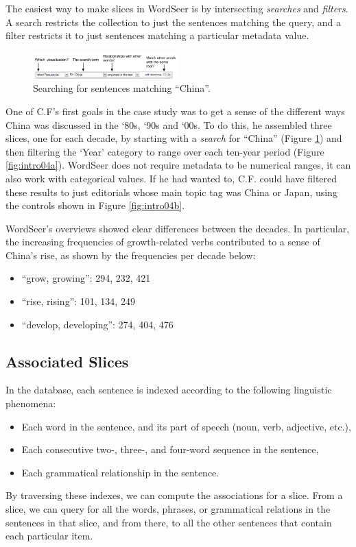 \documentclass{sig-alternate}
\begin{document}
The easiest way to make slices in WordSeer is by intersecting \emph{searches} and \emph{filters}.  A search restricts the collection to just the sentences matching the query, and a filter restricts it to just sentences matching a particular metadata value. 
\begin{figure}[ht!]
\begin{center}
	\includegraphics[width=0.5\textwidth]{fig/intro/03b.png}
\end{center}
    \caption{%
        Searching for sentences matching ``China''.\label{fig:intro03}
     }%
\end{figure}
One of C.F's first goals in the case study was to get a sense of the different ways China was discussed in the `80s, `90s and `00s. To do this, he assembled three slices, one for each decade, by starting with a \emph{search} for ``China'' (Figure \ref{fig:intro03})  and then filtering the `Year' category to range over each ten-year period (Figure \ref{fig:intro04a}).  WordSeer does not require metadata to be numerical ranges, it can also work with categorical values. If he had wanted to, C.F. could have filtered these results to just editorials whose main topic tag was China or Japan, using the controls shown in Figure \ref{fig:intro04b}. 

WordSeer's overviews showed clear differences between the decades. In particular, the increasing  frequencies of growth-related verbs contributed to a sense of China's rise, as shown by the frequencies per decade below:
\begin{itemize}
\item ``grow, growing'':  294, 232, 421
\item ``rise, rising'': 101, 134, 249
\item ``develop, developing'': 274, 404, 476
\end{itemize}

\subsection{Associated Slices}

 In the database, each sentence is indexed according to the following linguistic phenomena:
\begin{itemize}
  \item Each word in the sentence, and its part of speech (noun, verb, adjective, etc.),
  \item Each consecutive two-, three-, and four-word sequence in the sentence,
  \item Each grammatical relationship in the sentence. 
  \end{itemize}  
 By traversing these indexes, we can compute the associations for a slice. From a slice, we can query for all the words, phrases, or grammatical relations in the sentences in that slice, and from there, to all the other sentences that contain each particular item.  
\end{document}
